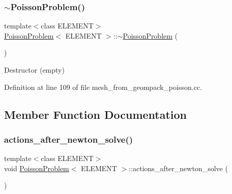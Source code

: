 \mbox{\label{classPoissonProblem_ac247e42d2d292200617f4b9db7ed1ab8}} 
\subsubsection{\texorpdfstring{$\sim$\+Poisson\+Problem()}{~PoissonProblem()}}
{\footnotesize\ttfamily template$<$class E\+L\+E\+M\+E\+NT$>$ \\
\hyperlink{classPoissonProblem}{Poisson\+Problem}$<$ E\+L\+E\+M\+E\+NT $>$\+::$\sim$\hyperlink{classPoissonProblem}{Poisson\+Problem} (\begin{DoxyParamCaption}{ }\end{DoxyParamCaption})\hspace{0.3cm}{\ttfamily [inline]}}



Destructor (empty) 



Definition at line 109 of file mesh\+\_\+from\+\_\+geompack\+\_\+poisson.\+cc.



\subsection{Member Function Documentation}
\mbox{\label{classPoissonProblem_a7a9478d8e1e5c7d3a886b00ab7d50bbd}} 
\subsubsection{\texorpdfstring{actions\+\_\+after\+\_\+newton\+\_\+solve()}{actions\_after\_newton\_solve()}}
{\footnotesize\ttfamily template$<$class E\+L\+E\+M\+E\+NT$>$ \\
void \hyperlink{classPoissonProblem}{Poisson\+Problem}$<$ E\+L\+E\+M\+E\+NT $>$\+::actions\+\_\+after\+\_\+newton\+\_\+solve (\begin{DoxyParamCaption}{ }\end{DoxyParamCaption})\hspace{0.3cm}{\ttfamily [inline]}}



